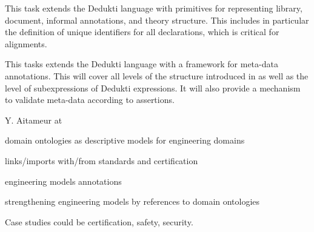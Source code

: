 \begin{workpackage}
\begin{tasklist}
\begin{task}[id=strlibstructure,title=Library Structure,lead=Fau,FauRM=12, SacRM=6]
This task extends the Dedukti language with primitives for representing library, document, informal annotations, and theory structure.
This includes in particular the definition of unique identifiers for all declarations, which is critical for alignments.
%
%
\end{task} 

\begin{task}[id=strdofimpl,title=Ontological Framework for Meta-Data,lead=Sac,SacRM=24]
This tasks extends the Dedukti language with a framework for meta-data annotations.
This will cover all levels of the structure introduced in  as well as the 
level of subexpressions of Dedukti expressions. It will also provide a mechanism to validate meta-data
according to assertions.
\end{task} 

\begin{task}[id=strdomonto,title= Domain Ontologies for Formal Methods in SE,lead=Tou,TouRM=12, SacRM=0]
Y. Aitameur at 
\begin{compactitem}
\item domain ontologies as descriptive models for engineering domains 
\item links/imports with/from standards and certification
\item engineering models annotations
\item strengthening engineering models by references to domain ontologies
\item Case studies could be certification, safety, security.
\end{compactitem}
\end{task} 


\end{tasklist}
\end{workpackage}
